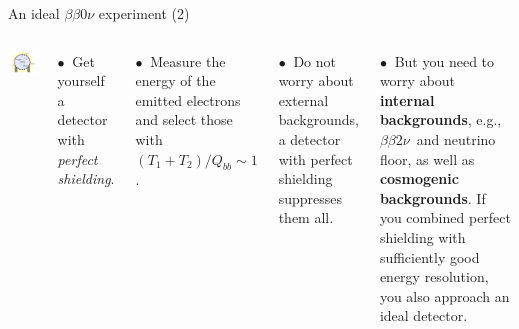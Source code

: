 \documentclass [aspectratio=169]{beamer}
\newcommand{\bbtnu}{\ensuremath{\beta\beta2\nu}}
\begin{document}
\begin{frame}{An ideal ${\beta\beta0\nu}$ experiment (2)}

\begin{columns}
\includegraphics[scale=0.70]{graxe.png}


$\bullet~$ Get yourself a detector with {\em perfect shielding}. 

$\bullet~$ Measure the energy of the emitted electrons and select those with 
$(T_1+T_2)/Q_{bb} \sim 1$.

$\bullet~$ Do not worry about external backgrounds, a detector with perfect shielding suppresses them all. 

$\bullet~$ But you need to worry about {\bf internal backgrounds}, e.g., \bbtnu\ and neutrino floor, as well as {\bf cosmogenic backgrounds}. If you combined perfect shielding with sufficiently good energy resolution, you also approach an ideal detector.  

\end{columns}
\end{frame}

\end{document}
